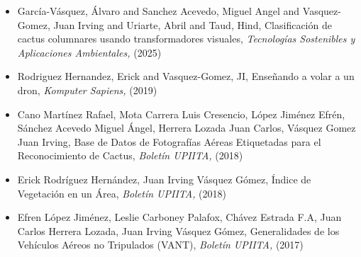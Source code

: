 \begin{itemize} 
\item Garc{\'i}a-V{\'a}squez, {\'A}lvaro and Sanchez Acevedo, Miguel Angel and Vasquez-Gomez, Juan Irving and Uriarte, Abril and Taud, Hind, Clasificaci{\'o}n de cactus columnares usando transformadores visuales,\textit{ Tecnolog{\'i}as Sostenibles y Aplicaciones Ambientales,} (2025)
\item Rodriguez Hernandez, Erick and Vasquez-Gomez, JI, Enseñando a volar a un dron,\textit{ Komputer Sapiens,} (2019)
\item Cano Martínez Rafael, Mota Carrera Luis Cresencio, López Jiménez Efrén, Sánchez Acevedo Miguel Ángel, Herrera Lozada Juan Carlos, Vásquez Gomez Juan Irving, Base de Datos de Fotografías Aéreas Etiquetadas para el Reconocimiento de Cactus,\textit{ Boletín UPIITA,} (2018)
\item Erick Rodríguez Hernández, Juan Irving Vásquez Gómez, Índice de Vegetación en un Área,\textit{ Boletín UPIITA,} (2018)
\item Efren López Jiménez, Leslie Carboney Palafox, Chávez Estrada F.A, Juan Carlos Herrera Lozada, Juan Irving Vásquez Gómez, Generalidades de los Vehículos Aéreos no Tripulados (VANT),\textit{ Boletín UPIITA,} (2017)
\end{itemize} 
